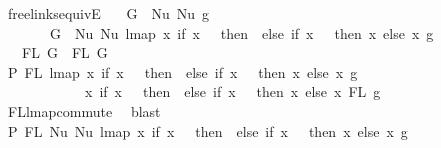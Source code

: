 \begin{isabellebody}
\isamarkupfalse%
%
\endisatagproof
{\isafoldproof}%
%
\isadelimproof
\isanewline
%
\endisadelimproof
\isanewline
\isanewline
{}\isamarkupfalse%
\ freelinks{\isacharunderscore}{\kern0pt}equiv{\isacharunderscore}{\kern0pt}E{}{\isacharcolon}{\kern0pt}\isanewline
\ \ \ {\isachardoublequoteopen}G{}\ {\isacharequal}{\kern0pt}\ Nu\ {\isacharparenleft}{\kern0pt}Nu\ g{\isacharparenright}{\kern0pt}{\isachardoublequoteclose}\isanewline
\ \ \ \ \ \ \ {\isachardoublequoteopen}G{}\ {\isacharequal}{\kern0pt}\ Nu\ {\isacharparenleft}{\kern0pt}Nu\ {\isacharparenleft}{\kern0pt}lmap\ {\isacharparenleft}{\kern0pt}{\isasymlambda}x{\isachardot}{\kern0pt}\ if\ x\ {\isacharequal}{\kern0pt}\ {}\ then\ {}\ else\ if\ x\ {\isacharequal}{\kern0pt}\ {}\ then\ x\ else\ x{\isacharparenright}{\kern0pt}\ g{\isacharparenright}{\kern0pt}{\isacharparenright}{\kern0pt}{\isachardoublequoteclose}\isanewline
\ \ \ {\isachardoublequoteopen}FL\ G{}\ {\isacharequal}{\kern0pt}\ FL\ G{}{\isachardoublequoteclose}\isanewline
%
\isadelimproof
%
\endisadelimproof
%
\isatagproof
{}\isamarkupfalse%
\ {\isacharminus}{\kern0pt}\isanewline
\ \ \isamarkupfalse%
\ P{}{\isacharcolon}{\kern0pt}\ {\isachardoublequoteopen}FL\ {\isacharparenleft}{\kern0pt}lmap\ {\isacharparenleft}{\kern0pt}{\isasymlambda}x{\isachardot}{\kern0pt}\ if\ x\ {\isacharequal}{\kern0pt}\ {}\ then\ {}\ else\ if\ x\ {\isacharequal}{\kern0pt}\ {}\ then\ x\ else\ x{\isacharparenright}{\kern0pt}\ g{\isacharparenright}{\kern0pt}\ {\isacharequal}{\kern0pt}\isanewline
\ \ \ \ \ \ \ \ \ \ \ \ {\isacharparenleft}{\kern0pt}{\isasymlambda}x{\isachardot}{\kern0pt}\ if\ x\ {\isacharequal}{\kern0pt}\ {}\ then\ {}\ else\ if\ x\ {\isacharequal}{\kern0pt}\ {}\ then\ x\ else\ x{\isacharparenright}{\kern0pt}{\isacharbackquote}{\kern0pt}\ FL\ g{\isachardoublequoteclose}\isanewline
\ \ \ \ \ \isamarkupfalse%
\ FL{\isacharunderscore}{\kern0pt}lmap{\isacharunderscore}{\kern0pt}commute\ \isamarkupfalse%
\ blast\isanewline
\isanewline
\ \ \isamarkupfalse%
\ P{}{\isacharcolon}{\kern0pt}\ {\isachardoublequoteopen}FL\ {\isacharparenleft}{\kern0pt}Nu\ {\isacharparenleft}{\kern0pt}Nu\ {\isacharparenleft}{\kern0pt}lmap\ {\isacharparenleft}{\kern0pt}{\isasymlambda}x{\isachardot}{\kern0pt}\ if\ x\ {\isacharequal}{\kern0pt}\ {}\ then\ {}\ else\ if\ x\ {\isacharequal}{\kern0pt}\ {}\ then\ x\ else\ x{\isacharparenright}{\kern0pt}\ g{\isacharparenright}{\kern0pt}{\isacharparenright}{\kern0pt}{\isacharparenright}{\kern0pt}\ {\isacharequal}{\kern0pt}\isanewline

\end{isabellebody}
